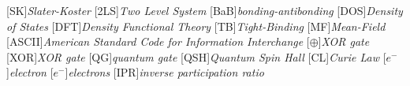 \begin{acronym}[TDMA]
  [SK]{\emph{Slater-Koster}}
  [2LS]{\emph{Two Level System}}
  [BaB]{\emph{bonding-antibonding}}
  [DOS]{\emph{Density of States}}
  [DFT]{\emph{Density Functional Theory}}
  [TB]{\emph{Tight-Binding}}
  [MF]{\emph{Mean-Field}}
  [ASCII]{\emph{American Standard Code for Information Interchange}}
  [$\oplus$]{\emph{XOR gate}}
  [XOR]{\emph{XOR gate}}
  [QG]{\emph{quantum gate}}
  [QSH]{\emph{Quantum Spin Hall}}
  [CL]{\emph{Curie Law}}
  [$e^{-}$]{\emph{electron}}
  [$e^{-}$]{\emph{electrons}}
  [IPR]{\emph{inverse participation ratio}}
\end{acronym}
